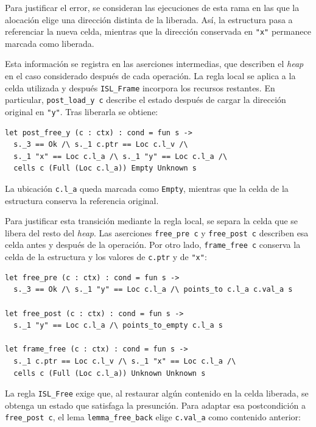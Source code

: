 \documentclass[a4paper,	11pt]{report}
\begin{document}
Para justificar el error,
se consideran las ejecuciones de esta rama en las que la alocación elige una dirección distinta de la liberada.
Así,
la estructura pasa a referenciar la nueva celda,
mientras que la dirección conservada en \lstinline|"x"| permanece marcada como liberada.

Esta información se registra en las aserciones intermedias,
que describen el \emph{heap} en el caso considerado después de cada operación.
La regla local se aplica a la celda utilizada y después \lstinline|ISL_Frame| incorpora los recursos restantes.
En particular,
\lstinline|post_load_y c| describe el estado después de cargar la dirección original en \lstinline|"y"|.
Tras liberarla se obtiene:

\begin{lstlisting}
let post_free_y (c : ctx) : cond = fun s ->
  s._3 == Ok /\ s._1 c.ptr == Loc c.l_v /\
  s._1 "x" == Loc c.l_a /\ s._1 "y" == Loc c.l_a /\
  cells c (Full (Loc c.l_a)) Empty Unknown s
\end{lstlisting}
La ubicación \lstinline|c.l_a| queda marcada como \lstinline|Empty|,
mientras que la celda de la estructura conserva la referencia original.

Para justificar esta transición mediante la regla local,
se separa la celda que se libera del resto del \emph{heap}.
Las aserciones \lstinline|free_pre c| y \lstinline|free_post c| describen esa celda antes y después de la operación.
Por otro lado,
\lstinline|frame_free c| conserva la celda de la estructura y los valores de \lstinline|c.ptr| y de \lstinline|"x"|:

\begin{lstlisting}
let free_pre (c : ctx) : cond = fun s ->
  s._3 == Ok /\ s._1 "y" == Loc c.l_a /\ points_to c.l_a c.val_a s

let free_post (c : ctx) : cond = fun s ->
  s._1 "y" == Loc c.l_a /\ points_to_empty c.l_a s

let frame_free (c : ctx) : cond = fun s ->
  s._1 c.ptr == Loc c.l_v /\ s._1 "x" == Loc c.l_a /\
  cells c (Full (Loc c.l_a)) Unknown Unknown s
\end{lstlisting}

La regla \lstinline|ISL_Free| exige que,
al restaurar algún contenido en la celda liberada,
se obtenga un estado que satisfaga la presunción.
Para adaptar esa postcondición a \lstinline|free_post c|,
el lema \lstinline|lemma_free_back| elige \lstinline|c.val_a| como contenido anterior:
\end{document}
